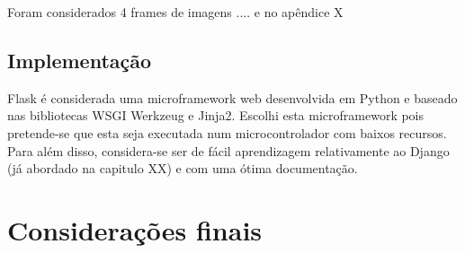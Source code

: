 Foram considerados 4 frames de imagens .... e no apêndice X




\subsection{Implementação}



Flask é considerada uma microframework web desenvolvida em Python e baseado nas bibliotecas WSGI Werkzeug e Jinja2. Escolhi esta microframework pois pretende-se que esta seja executada num microcontrolador com baixos recursos. Para além disso, considera-se ser de fácil aprendizagem relativamente ao Django (já abordado na capitulo XX) e com uma ótima documentação. 





\section{Considerações finais}





